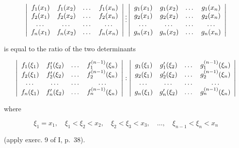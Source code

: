 \[
\left| \begin{array}{c c c c} f _ {1} (x _ {1}) & f _ {1} (x _ {2}) & \dots & f _ {1} (x _ {n}) \\ f _ {2} (x _ {1}) & f _ {2} (x _ {2}) & \dots & f _ {2} (x _ {n}) \\ \dots & \dots & \dots & \dots \\ f _ {n} (x _ {1}) & f _ {n} (x _ {2}) & \dots & f _ {n} (x _ {n}) \end{array} \right| \vdots \left| \begin{array}{c c c c} g _ {1} (x _ {1}) & g _ {1} (x _ {2}) & \dots & g _ {1} (x _ {n}) \\ g _ {2} (x _ {1}) & g _ {2} (x _ {2}) & \dots & g _ {2} (x _ {n}) \\ \dots & \dots & \dots & \dots \\ g _ {n} (x _ {1}) & g _ {n} (x _ {2}) & \dots & g _ {n} (x _ {n}) \end{array} \right|
\]

is equal to the ratio of the two determinants

\[
\left| \begin{array}{c c c c} f _ {1} (\xi_ {1}) & f _ {1} ^ {\prime} (\xi_ {2}) & \dots & f _ {1} ^ {(n - 1)} (\xi_ {n}) \\ f _ {2} (\xi_ {1}) & f _ {2} ^ {\prime} (\xi_ {2}) & \dots & f _ {2} ^ {(n - 1)} (\xi_ {n}) \\ \dots & \dots & \dots & \dots \\ f _ {n} (\xi_ {1}) & f _ {n} ^ {\prime} (\xi_ {2}) & \dots & f _ {n} ^ {(n - 1)} (\xi_ {n}) \end{array} \right|: \left| \begin{array}{c c c c} g _ {1} (\xi_ {1}) & g _ {1} ^ {\prime} (\xi_ {2}) & \dots & g _ {1} ^ {(n - 1)} (\xi_ {n}) \\ g _ {2} (\xi_ {1}) & g _ {2} ^ {\prime} (\xi_ {2}) & \dots & g _ {2} ^ {(n - 1)} (\xi_ {n}) \\ \dots & \dots & \dots & \dots \\ g _ {n} (\xi_ {1}) & g _ {n} ^ {\prime} (\xi_ {2}) & \dots & g _ {n} ^ {(n - 1)} (\xi_ {n}) \end{array} \right|
\]

where

\[
\xi_ {1} = x _ {1}, \quad \xi_ {1} <   \xi_ {2} <   x _ {2}, \quad \xi_ {2} <   \xi_ {3} <   x _ {3}, \quad \dots , \quad \xi_ {n - 1} <   \xi_ {n} <   x _ {n}
\]

(apply exerc. 9 of I, p.~38).

